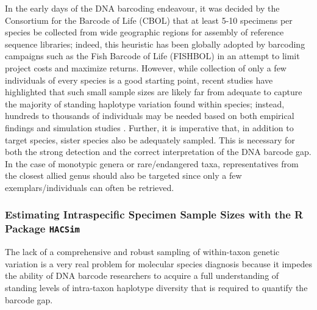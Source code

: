 In the early days of the DNA barcoding endeavour, it was decided by the Consortium for the Barcode of Life (CBOL) that at least 5-10 specimens per species be collected from wide geographic regions for assembly of reference sequence libraries; indeed, this heuristic has been globally adopted by barcoding campaigns such as the Fish Barcode of Life (FISHBOL) \cite{ward2009campaign} in an attempt to limit project costs and maximize returns. However, while collection of only a few individuals of every species is a good starting point, recent studies have highlighted that such small sample sizes are likely far from adequate to capture the majority of standing haplotype variation found within species; instead, hundreds to thousands of individuals may be needed based on both empirical findings and simulation studies \cite{zhang2010estimating, phillips2015exploration, phillips2019incomplete}. Further, it is imperative that, in addition to target species, sister species also be adequately sampled. This is necessary for both the strong detection and the correct interpretation of the DNA barcode gap. In the case of monotypic genera or rare/endangered taxa, representatives from the closest allied genus should also be targeted since only a few exemplars/individuals can often be retrieved. 



\subsubsection{Estimating Intraspecific Specimen Sample Sizes with the R Package {\tt HACSim}}

The lack of a comprehensive and robust sampling of within-taxon genetic variation is a very real problem for molecular species diagnosis because it impedes the ability of DNA barcode researchers to acquire a full understanding of standing levels of intra-taxon haplotype diversity that is required to quantify the barcode gap.



